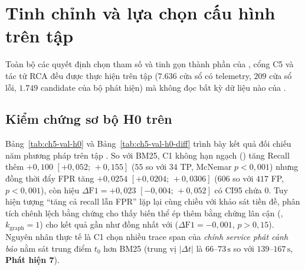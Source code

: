 \section{Tinh chỉnh và lựa chọn cấu hình trên tập }
\label{sec:ch5-val}

Toàn bộ các quyết định chọn tham số và tinh gọn thành phần của \CTAV{}, cổng C5 và tác tử RCA đều được thực hiện trên tập  ($7.636$ cửa sổ có telemetry, $209$ cửa sổ lỗi, $1.749$ candidate của bộ phát hiện) mà không đọc bất kỳ dữ liệu nào của .

\subsection{Kiểm chứng sơ bộ H0 trên }
\label{sec:ch5-val-h0}

Bảng~\ref{tab:ch5-val-h0} và Bảng~\ref{tab:ch5-val-h0-diff} trình bày kết quả đối chiếu năm phương pháp trên tập . So với BM25, C1 không hạn ngạch () tăng Recall thêm $+0{,}100$ $[+0{,}052;\, +0{,}155]$ ($55$ so với $34$ TP, McNemar $p < 0{,}001$) nhưng đồng thời đẩy FPR tăng $+0{,}0254$ $[+0{,}0204;\, +0{,}0306]$ ($606$ so với $417$ FP, $p < 0{,}001$), còn hiệu $\Delta\text{F1} = +0{,}023$ $[-0{,}004;\, +0{,}052]$ có CI95 chứa $0$. Tuy hiện tượng ``tăng cả recall lẫn FPR'' lặp lại cùng chiều với khảo sát tiền đề, phân tích chênh lệch bằng chứng cho thấy biến thể ép thêm bằng chứng lân cận (, $k_{\text{graph}} = 1$) cho kết quả gần như đồng nhất với  ($\Delta\text{F1} = -0{,}001$, $p > 0{,}15$). Nguyên nhân thực tế là C1 chọn nhiều trace span của \emph{chính service phát cảnh báo} nằm sát trung điểm $t_0$ hơn BM25 (trung vị $|\Delta t|$ là $66$--$73\,\text{s}$ so với $139$--$167\,\text{s}$, \textbf{Phát hiện 7}).

